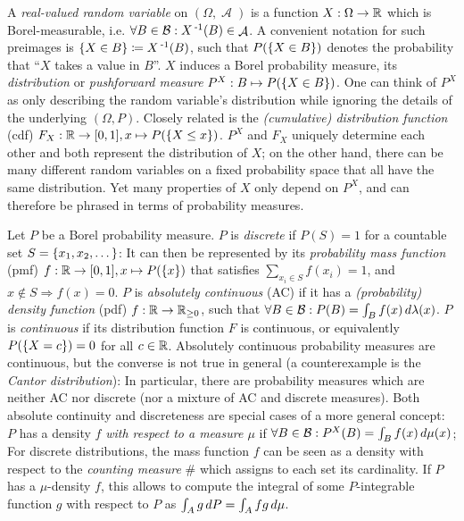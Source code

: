 \documentclass[a4paper,DIV=11,abstracton,twoside=semi]{scrreprt}
\DeclareMathOperator{\A}{\mathcal{A}}
\newcommand{\Rp}{\mathbb{R}_{\geq 0}}
\newcommand{\B}{\mathcal{B}}
\theoremstyle{definition}
\begin{document}
    A \emph{real-valued random variable} on $(\Omega, \A)$ is a function $X: \Omega \to \mathbb{R}$ which is Borel-measurable, i.e. $\forall B \in \B: X\inv(B) \in \A$. 
    A convenient notation for such preimages is $\{X \in B\} \coloneqq X\operatorname{^{-1}}(B)$, such that $P(\{X \in B\})$ denotes the probability that “$X$ takes a value in $B$”.
    $X$ induces a Borel probability measure, its \emph{distribution} or \emph{pushforward measure} $P^X: B \mapsto P(\{X \in B\})$. One can think of $P^X$ as only describing the random variable's distribution while ignoring the details of the underlying $(\Omega, P)$.
    Closely related is the \emph{(cumulative) distribution function} (cdf) $F_X: \mathbb{R} \to [0, 1], x \mapsto P(\{X \leq x\})$.
    $P^X$ and $F_X$ uniquely determine each other and both represent the distribution of $X$; on the other hand, there can be many different random variables on a fixed probability space that all have the same distribution.
    Yet many properties of $X$ only depend on $P^X$, and can therefore be phrased in terms of probability measures.
    \cite[Sections 14, 20]{bib:billingsleyProbabilityAndMeasure}
    
    Let $P$ be a Borel probability measure.
    $P$ is \emph{discrete} if $P(S) = 1$ for a countable set $S = \{x_1, x_2, \dots\}$: It can then be represented by its \emph{probability mass function} (pmf) $f: \mathbb{R} \to [0, 1], x \mapsto P(\{x\})$ that satisfies $\sum_{x_i \in S} f(x_i) = 1$, and $x \notin S \Rightarrow f(x) = 0$.
    $P$ is \emph{absolutely continuous} (AC) if it has a \emph{(probability) density function} (pdf) $f: \R \to \Rp$, such that $\forall B \in \B: P(B) = \lintegral{B}{f(x)}{\lambda(x)}$.
    $P$ is \emph{continuous} if its distribution function $F$ is continuous, or equivalently $P(\{X = c\}) = 0$ for all $c \in \mathbb{R}$.
    Absolutely continuous probability measures are continuous, but the converse is not true in general (a counterexample is the \emph{Cantor distribution}): In particular, there are probability measures which are neither AC nor discrete (nor a mixture of AC and discrete measures).
    Both absolute continuity and discreteness are special cases of a more general concept: $P$ has a density $f$ \emph{with respect to a measure $\mu$} if $\forall B \in \B: P^X(B) = \lintegral{B}{f(x)}{\mu(x)}$; For discrete distributions, the mass function $f$ can be seen as a density with respect to the \emph{counting measure} $\#$ which assigns to each set its cardinality.
    If $P$ has a $\mu$-density $f$, this allows to compute the integral of some $P$-integrable function $g$ with respect to $P$ as $\int_{A} g \, dP = \int_{A} f g \, d\mu$. 
    \cite[Sections 16, 20, 31]{bib:billingsleyProbabilityAndMeasure}
    
\end{document}
